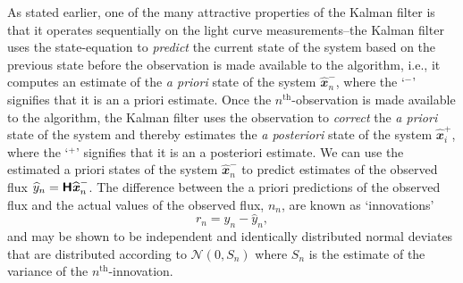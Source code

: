 \documentclass[a4paper,fleqn,usenatbib]{mnras}
\begin{document}
As stated earlier, one of the many attractive properties of the Kalman filter is that it operates sequentially on the light curve measurements--the Kalman filter uses the state-equation to \textit{predict} the current state of the system based on the previous state before the observation is made available to the algorithm, i.e., it computes an estimate of the \textit{a priori} state of the system $\widehat{\mathbfit{x}}^{-}_{n}$, where the `$^{-}$' signifies that it is an a priori estimate. Once the $n^{\mathrm{th}}$-observation is made available to the algorithm, the Kalman filter uses the observation to \textit{correct} the \textit{a priori} state of the system and thereby estimates the \textit{a posteriori} state of the system $\widehat{\mathbfit{x}}^{+}_{i}$, where the `$^{+}$' signifies that it is an a posteriori estimate. We can use the estimated a priori states of the system $\widehat{\mathbfit{x}}^{-}_{n}$ to predict estimates of the observed flux $\widehat{y}_{n} = \textbf{\textsf{H}}\widehat{\textbf{\textit{x}}}^{-}_{n}$. The difference between the a priori predictions of the observed flux and the actual values of the observed flux, $n_{n}$, are known as `innovations'
\begin{equation}\label{eq:InnovationPrelim}
r_{n} = y_{n} - \widehat{y}_{n},
\end{equation}
and may be shown to be independent and identically distributed normal deviates \citep[chapter 10.2]{Simon} that are distributed according to $\mathcal{N}(0,S_{n})$ where $S_{n}$ is the estimate of the variance of the $n^{\mathrm{th}}$-innovation.
\end{document}
